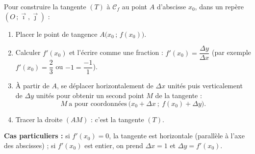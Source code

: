 \documentclass[11pt]{article}
\begin{document}
\begin{methode}
Pour construire la tangente $(T)$ à $\mathcal{C}_f$ au point $A$ d'abscisse $x_0$, dans un repère $(O\,;\vec\imath,\vec\jmath)$ :
\begin{enumerate}
\item Placer le point de tangence $A\big(x_0\,;\,f(x_0)\big)$.
\item Calculer $f'(x_0)$ et l'écrire comme une fraction : $f'(x_0)=\dfrac{\Delta y}{\Delta x}$ (par exemple $f'(x_0)=\dfrac{2}{3}$ ou $-1=\dfrac{-1}{1}$).
\item À partir de $A$, se déplacer horizontalement de $\Delta x$ unités puis verticalement de $\Delta y$ unités pour obtenir un second point $M$ de la tangente :
\[ M\ \text{a pour coordonnées}\ \big(x_0+\Delta x\ ;\ f(x_0)+\Delta y\big). \]
\item Tracer la droite $(AM)$ : c'est la tangente $(T)$.
\end{enumerate}
\textbf{Cas particuliers :} si $f'(x_0)=0$, la tangente est horizontale (parallèle à l'axe des abscisses) ; si $f'(x_0)$ est entier, on prend $\Delta x=1$ et $\Delta y=f'(x_0)$.
\end{methode}
\end{document}
